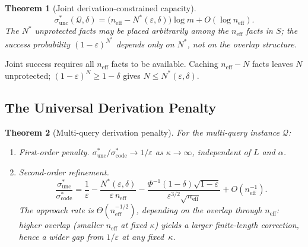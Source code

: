 \documentclass[journal]{IEEEtran}
\makeatletter
\newtheorem{theorem}{Theorem}[section]
\numberwithin{equation}{section}
\renewenvironment{proof}[1][\proofname]{\par
  \pushQED{\qed}%
  \normalfont \topsep6\p@\@plus6\p@\relax
  \trivlist
  \item[\hskip\labelsep
        \itshape
    #1\@addpunct{.}]\ignorespaces
}{%
  \popQED\endtrivlist\@endpefalse
}
\makeatother
\begin{document}
\begin{theorem}[Joint derivation-constrained capacity]
\label{thm:joint-unc-mq}
\begin{equation}\label{eq:joint-unc-exact-mq}
  \sigma^*_{\mathrm{unc}}(\mathcal Q,\delta)
  =\bigl(n_{\mathrm{eff}}-N^*(\varepsilon,\delta)\bigr)\log m
  +O(\log n_{\mathrm{eff}}).
\end{equation}
The $N^*$ unprotected facts may be placed arbitrarily among
the $n_{\mathrm{eff}}$ facts in $S$; the success probability
$(1{-}\varepsilon)^{N^*}$ depends only on $N^*$, not on the
overlap structure.
\end{theorem}

\begin{proof}
Joint success requires all $n_{\mathrm{eff}}$ facts to be
available.
Caching $n_{\mathrm{eff}}{-}N$ facts leaves $N$ unprotected;
$(1{-}\varepsilon)^N\ge 1{-}\delta$ gives
$N\le N^*(\varepsilon,\delta)$.
\end{proof}

\subsection{The Universal Derivation Penalty}
\label{subsec:mq-penalty}

\begin{theorem}[Multi-query derivation penalty]
\label{thm:multi-penalty-mq}
For the multi-query instance $\mathcal Q$:
\begin{enumerate}[label=\textup{(\Roman*)}]
\item \emph{First-order penalty.}\;
$\sigma^*_{\mathrm{unc}}/\sigma^*_{\mathrm{code}}
\to 1/\varepsilon$ as $\kappa\to\infty$,
independent of $L$ and $\alpha$.

\item \emph{Second-order refinement.}\;
\begin{equation}\label{eq:multi-penalty-2-mq}
  \frac{\sigma^*_{\mathrm{unc}}}
       {\sigma^*_{\mathrm{code}}}
  =\frac{1}{\varepsilon}
  -\frac{N^*(\varepsilon,\delta)}{\varepsilon\,n_{\mathrm{eff}}}
  -\frac{\Phi^{-1}(1{-}\delta)\sqrt{1{-}\varepsilon}}
        {\varepsilon^{3/2}\sqrt{n_{\mathrm{eff}}}}
  +O(n_{\mathrm{eff}}^{-1}).
\end{equation}
The approach rate is $\Theta(n_{\mathrm{eff}}^{-1/2})$,
depending on the overlap through $n_{\mathrm{eff}}$:
higher overlap \textup{(}smaller $n_{\mathrm{eff}}$ at
fixed $\kappa$\textup{)} yields a larger finite-length
correction, hence a wider gap from $1/\varepsilon$ at
any fixed~$\kappa$.
\end{enumerate}
\end{theorem}
\end{document}
